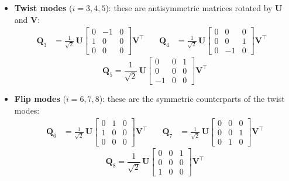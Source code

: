 \documentclass{article}
\begin{document}
\begin{itemize}
\item \textbf{Twist modes} ($i = 3,4,5$):
these are antisymmetric matrices rotated by $\mathbf{U}$ and
$\mathbf{V}$:
\begin{equation*}
\begin{aligned}
    \mathbf{Q}_3 &= \frac{1}{\sqrt{2}}\,\mathbf{U}
    \begin{bmatrix}
        0 & -1 & 0 \\
        1 &  0 & 0 \\
        0 &  0 & 0
    \end{bmatrix}\mathbf{V}^\top & \quad
    \mathbf{Q}_4 &= \frac{1}{\sqrt{2}}\,\mathbf{U}
    \begin{bmatrix}
        0 &  0 & 0 \\
        0 &  0 & 1 \\
        0 & -1 & 0
    \end{bmatrix}\mathbf{V}^\top &
\end{aligned}
\end{equation*}
\begin{equation*}
    \mathbf{Q}_5 = \frac{1}{\sqrt{2}}\,\mathbf{U}
    \begin{bmatrix}
         0 & 0 & 1 \\
         0 & 0 & 0 \\
        -1 & 0 & 0
    \end{bmatrix}\mathbf{V}^\top
\end{equation*}

\item \textbf{Flip modes} ($i = 6,7,8$):
these are the symmetric counterparts of the twist modes:
\begin{equation*}
\begin{aligned}
    \mathbf{Q}_6 &= \frac{1}{\sqrt{2}}\,\mathbf{U}
    \begin{bmatrix}
        0 & 1 & 0 \\
        1 & 0 & 0 \\
        0 & 0 & 0
    \end{bmatrix}\mathbf{V}^\top & \quad
    \mathbf{Q}_7 &= \frac{1}{\sqrt{2}}\,\mathbf{U}
    \begin{bmatrix}
        0 & 0 & 0 \\
        0 & 0 & 1 \\
        0 & 1 & 0
    \end{bmatrix}\mathbf{V}^\top 
\end{aligned}
\end{equation*}
\begin{equation*}
    \mathbf{Q}_8 = \frac{1}{\sqrt{2}}\,\mathbf{U}
    \begin{bmatrix}
        0 & 0 & 1 \\
        0 & 0 & 0 \\
        1 & 0 & 0
    \end{bmatrix}\mathbf{V}^\top
\end{equation*}
\end{itemize}
\end{document}
